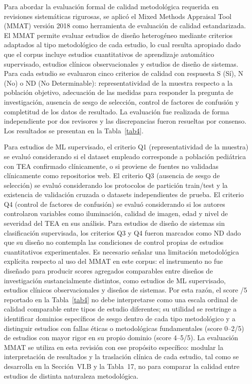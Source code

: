 \documentclass[3p,twocolumn,times]{elsarticle}
\begin{document}
	Para abordar la evaluación formal de calidad metodológica requerida en revisiones
	sistemáticas rigurosas, se aplicó el Mixed Methods Appraisal Tool (MMAT) versión
	2018 como herramienta de evaluación de calidad estandarizada. El MMAT permite
	evaluar estudios de diseño heterogéneo mediante criterios adaptados al tipo
	metodológico de cada estudio, lo cual resulta apropiado dado que el corpus incluye
	estudios cuantitativos de aprendizaje automático supervisado, estudios clínicos
	observacionales y estudios de diseño de sistemas. Para cada estudio se evaluaron
	cinco criterios de calidad con respuesta S (Sí), N (No) o ND (No Determinable):
	representatividad de la muestra respecto a la población objetivo, adecuación de
	las medidas para responder la pregunta de investigación, ausencia de sesgo de
	selección, control de factores de confusión y completitud de los datos de
	resultado. La evaluación fue realizada de forma independiente por dos revisores y
	las discrepancias fueron resueltas por consenso. Los resultados se presentan en
	la Tabla~\ref{tab4}.
	
	Para estudios de ML supervisado, el criterio Q1 (representatividad de la muestra)
	se evaluó considerando si el dataset empleado corresponde a población pediátrica
	con TEA confirmado clínicamente, o si proviene de fuentes no validadas clínicamente
	como repositorios web. El criterio Q3 (ausencia de sesgo de selección) se evaluó
	considerando los protocolos de partición train/test y la existencia de validación
	cruzada o datasets independientes de prueba. El criterio Q4 (control de factores
	de confusión) se evaluó considerando si los autores controlaron variables como
	iluminación, calidad de imagen, edad y nivel de severidad del TEA en sus análisis.
	Para estudios de diseño de sistemas sin clasificación supervisada, los criterios
	Q3 y Q4 fueron marcados como ND dado que su diseño no contempla las condiciones
	de control propias de estudios cuantitativos experimentales. Es necesario señalar
	una limitación metodológica explícita respecto al uso del MMAT en este corpus: el
	instrumento no fue diseñado para producir scores agregados comparables entre
	diseños de investigación sustancialmente distintos, como estudios de ML supervisado,
	estudios clínicos observacionales y diseños de sistemas. Por esta razón, el score
	/5 reportado en la Tabla~\ref{tab4} no debe interpretarse como una escala ordinal
	de calidad comparable entre tipos de estudio diferentes; su utilidad se restringe
	a identificar dominios específicos de sesgo dentro de cada tipo metodológico y a
	distinguir estudios con fallas éticas o metodológicas fundamentales (score 0--2/5)
	de estudios con mayor rigor en su propio dominio (score 4--5/5). La evaluación
	MMAT se utiliza en esta revisión con ese propósito específico: modular la
	interpretación de resultados y la traslación clínica de cada estudio, tal como se
	desarrolla en la Sección~VI.B y la Tabla~17, no para comparar la calidad entre
	estudios de distinta naturaleza metodológica.
	
\end{document}
